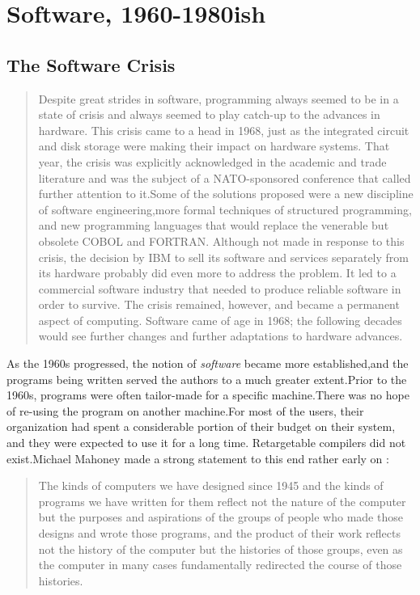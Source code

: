 
\chapter{Software, 1960-1980ish}
\section{The Software Crisis}
\begin{quotation}
    Despite great strides in software, programming always seemed to be in a state of crisis and 
always seemed to play catch-up to the advances in hardware. This crisis came to a head in 1968, just 
as the integrated circuit and disk storage were making their impact on hardware systems. That year, 
the crisis was explicitly acknowledged in the academic and trade literature and was the subject of a 
NATO-sponsored conference that called further attention to it.Some of the solutions proposed were a 
new discipline of software engineering,more formal techniques of structured programming, and new 
programming languages that would replace the venerable but obsolete COBOL and FORTRAN. Although 
not made in response to this crisis, the decision by IBM to sell its software and services separately 
from its hardware probably did even more to address the problem. It led to a commercial software 
industry that needed to produce reliable software in order to survive. The crisis remained, however, 
and became a permanent aspect of computing. Software came of age in 1968; the following decades would 
see further changes and further adaptations to hardware advances.
\cite{history_of_modern_computing_2003_ceruzzi}
\end{quotation}
As the 1960s progressed, 
the notion of 
\textit{software} became more established,and the programs being written served the authors to a 
much greater extent.Prior to the 1960s, programs were often tailor-made for a specific 
machine.There was no hope of re-using the program on another machine.For most of the users, their 
organization had spent a considerable portion of their budget on their system, and they were 
expected to use it for a long time. Retargetable compilers did not exist.Michael Mahoney made a 
strong statement to this end rather early on 
\cite[The Structures of Computation]{the-first-computers-2002}:
\begin{quotation}
    The kinds of computers we have designed since 1945 and the kinds of programs we have written for 
them reflect not the nature of the computer but the purposes and aspirations of the groups of people 
who made those designs and wrote those programs, and the product of their work reflects not the 
history of the computer but the histories of those groups, even as the computer in many 
cases fundamentally redirected the course of those histories.
\end{quotation}
